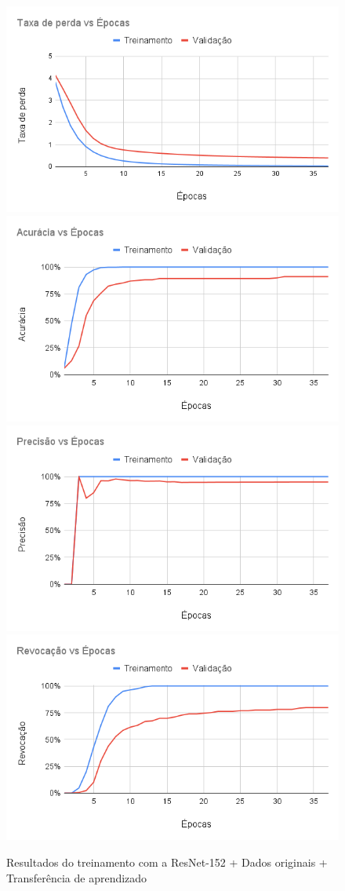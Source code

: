\documentclass[
	12pt,				%
	oneside,			%
	a4paper,			%
	english,			%
	brazil				%
	]{abntex2ppgsi}
\begin{document}
\begin{figure}[H]
    \centering
    \caption{Resultados do treinamento com a ResNet-152 + Dados originais + Transferência de aprendizado}
    \includegraphics[width=.50\textwidth]{imagens/resultados_discussao/architecture/resnet_152/transfer_learning/original/perda.png}\hfill
    \includegraphics[width=.50\textwidth]{imagens/resultados_discussao/architecture/resnet_152/transfer_learning/original/acuracia.png}\bigbreak    \includegraphics[width=.50\textwidth]{imagens/resultados_discussao/architecture/resnet_152/transfer_learning/original/precisao.png}\hfill
    \includegraphics[width=.50\textwidth]{imagens/resultados_discussao/architecture/resnet_152/transfer_learning/original/revocacao.png}
    \label{fig:resnet_152_original_transferencia_aprendizado}
\end{figure}
\end{document}

